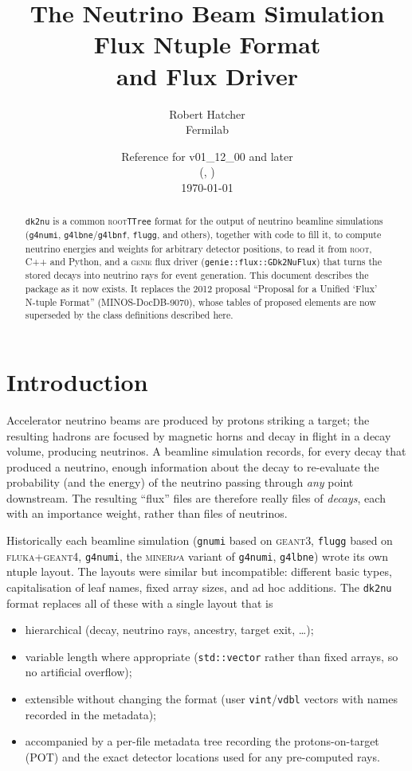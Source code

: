 \documentclass[11pt]{article}
\title{The \dktwonu Neutrino Beam Simulation\\Flux Ntuple Format\\
       and \genie Flux Driver}
\author{Robert Hatcher\\Fermilab}
\date{Reference for \dktwonu v01\_12\_00 and later\\
      (\code{DK2NUVER 12}, \code{DKMETAVER 6})\\[1ex] \today}
\newcommand{\code}[1]{\texttt{#1}}
\newcommand{\genie}{\textsc{genie}\xspace}
\newcommand{\geant}{\textsc{geant}\xspace}
\newcommand{\ROOT}{\textsc{root}\xspace}
\newcommand{\dktwonu}{\texttt{dk2nu}\xspace}
\begin{document}
\maketitle

\begin{abstract}
\noindent
\dktwonu is a common \ROOT \code{TTree} format for the output of neutrino
beamline simulations (\code{g4numi}, \code{g4lbne}/\code{g4lbnf},
\code{flugg}, and others), together with code to fill it, to compute
neutrino energies and weights for arbitrary detector positions, to read it
from \ROOT, C++ and Python, and a \genie flux driver
(\code{genie::flux::GDk2NuFlux}) that turns the stored decays into neutrino
rays for event generation.  This document describes the package as it now
exists.  It replaces the 2012 proposal ``Proposal for a Unified `Flux'
N-tuple Format'' (MINOS-DocDB-9070), whose tables of proposed elements are
now superseded by the class definitions described here.
\end{abstract}

\tableofcontents
\clearpage

\section{Introduction}\label{sec:intro}

Accelerator neutrino beams are produced by protons striking a target; the
resulting hadrons are focused by magnetic horns and decay in flight in a
decay volume, producing neutrinos.  A beamline simulation records, for every
decay that produced a neutrino, enough information about the decay to
re-evaluate the probability (and the energy) of the neutrino passing through
\emph{any} point downstream.  The resulting ``flux'' files are therefore
really files of \emph{decays}, each with an importance weight, rather than
files of neutrinos.

Historically each beamline simulation (\code{gnumi} based on \geant{}3,
\code{flugg} based on \textsc{fluka}+\geant{}4, \code{g4numi}, the
\textsc{miner}$\nu$\textsc{a} variant of \code{g4numi}, \code{g4lbne})
wrote its own ntuple layout.  The layouts were similar but incompatible:
different basic types, capitalisation of leaf names, fixed array sizes, and
ad hoc additions.  The \dktwonu format replaces all of these with a single
layout that is
\begin{itemize}[nosep]
\item hierarchical (decay, neutrino rays, ancestry, target exit, \ldots);
\item variable length where appropriate (\code{std::vector} rather than fixed
      arrays, so no artificial overflow);
\item extensible without changing the format (user \code{vint}/\code{vdbl}
      vectors with names recorded in the metadata);
\item accompanied by a per-file metadata tree recording the protons-on-target
      (POT) and the exact detector locations used for any pre-computed rays.
\end{itemize}
\end{document}
